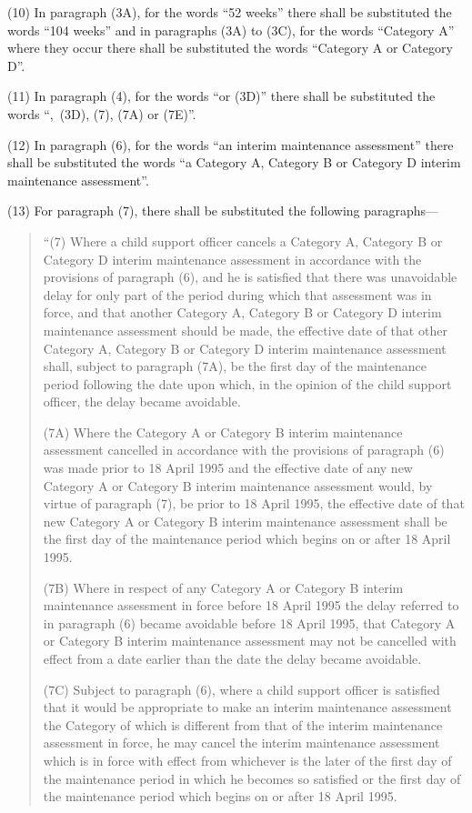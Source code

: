 \documentclass[12pt,a4paper]{article}
\begin{document}
(10) In paragraph (3A), for the words “52 weeks” there shall be substituted the words “104 weeks” and in paragraphs (3A) to (3C), for the words “Category A” where they occur there shall be substituted the words “Category A or Category D”.

(11) In paragraph (4), for the words “or (3D)” there shall be substituted the words “,~(3D), (7), (7A) or (7E)”.

(12) In paragraph (6), for the words “an interim maintenance assessment” there shall be substituted the words “a Category A, Category B or Category D interim maintenance assessment”.

(13) For paragraph (7), there shall be substituted the following paragraphs—
\begin{quotation}
“(7) Where a child support officer cancels a Category A, Category B or Category D interim maintenance assessment in accordance with the provisions of paragraph (6), and he is satisfied that there was unavoidable delay for only part of the period during which that assessment was in force, and that another Category A, Category B or Category D interim maintenance assessment should be made, the effective date of that other Category A, Category B or Category D interim maintenance assessment shall, subject to paragraph (7A), be the first day of the maintenance period following the date upon which, in the opinion of the child support officer, the delay became avoidable.

(7A) Where the Category A or Category B interim maintenance assessment cancelled in accordance with the provisions of paragraph (6) was made prior to 18 April 1995 and the effective date of any new Category A or Category B interim maintenance assessment would, by virtue of paragraph (7), be prior to 18 April 1995, the effective date of that new Category A or Category B interim maintenance assessment shall be the first day of the maintenance period which begins on or after 18 April 1995.

(7B) Where in respect of any Category A or Category B interim maintenance assessment in force before 18 April 1995 the delay referred to in paragraph (6) became avoidable before 18 April 1995, that Category A or Category B interim maintenance assessment may not be cancelled with effect from a date earlier than the date the delay became avoidable.

(7C) Subject to paragraph (6), where a child support officer is satisfied that it would be appropriate to make an interim maintenance assessment the Category of which is different from that of the interim maintenance assessment in force, he may cancel the interim maintenance assessment which is in force with effect from whichever is the later of the first day of the maintenance period in which he becomes so satisfied or the first day of the maintenance period which begins on or after 18 April 1995.


\end{quotation}
\end{document}
